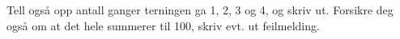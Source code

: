 %
%
Tell også opp antall ganger terningen ga 1, 2, 3 og 4, og skriv ut.
Forsikre deg også om at det hele summerer til 100, skriv evt. ut feilmelding.
